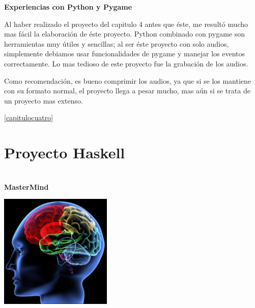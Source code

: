 \documentclass[12pt]{report}
\begin{document}

	\begingroup
		\large{
			\textbf{
				\newline
				\newline
				\newline
				Experiencias con Python y Pygame
				\newline
				\newline
			}
		}
	\endgroup

Al haber realizado el proyecto del capitulo 4 antes que éste, me resultó mucho mas fácil la elaboración de éste proyecto.
Python combinado con pygame son herramientas muy útiles y sencillas; al ser éste proyecto con solo audios, simplemente debiamos usar funcionalidades de pygame y manejar los eventos correctamente.
Lo mas tedioso de este proyecto fue la grabación de los audios.

Como recomendación, es bueno comprimir los audios, ya que si se los mantiene con su formato normal, el proyecto llega a pesar mucho, mas aún si se trata de un proyecto mas extenso.



 \ref{capitulocuatro}




\chapter{Proyecto Haskell\label{capitulocinco}}
\begin{center}
		\Huge{\textbf{\\MasterMind	\vspace{1em}}}
\end{center}	

	\begin{center}
		\begingroup

			\includegraphics[width=0.4\textwidth]{imagenes_usuario/mastermind.jpg}
		\endgroup
	\end{center}
\end{document}
